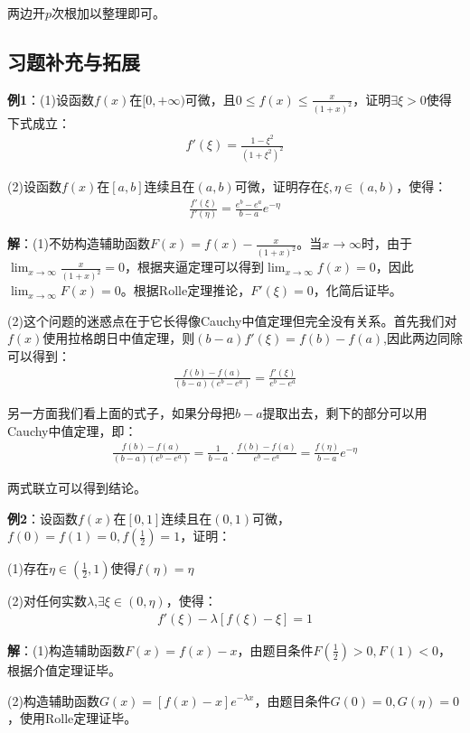 \documentclass{ctexart}
\let\oldtextbf\textbf %
\renewcommand{\textbf}[1]{\textcolor{btex}{\oldtextbf{#1}}} %
\begin{document}
两边开$p$次根加以整理即可。

\subsection{习题补充与拓展}
\textbf{例1}：(1)设函数$f(x)$在$[0,+\infty)$可微，且$0\leq f(x)\leq\frac{x}{(1+x)^2}$，证明$\exists \xi>0$使得下式成立：
\begin{align*}
    f'(\xi)=\frac{1-\xi^2}{(1+\xi^2)^2}
\end{align*}

(2)设函数$f(x)$在$[a,b]$连续且在$(a,b)$可微，证明存在$\xi,\eta\in(a,b)$，使得：
\begin{align*}
    \frac{f'(\xi)}{f'(\eta)}=\frac{e^b-e^a}{b-a}e^{-\eta}
\end{align*}

\textbf{解}：(1)不妨构造辅助函数$F(x)=f(x)-\frac{x}{(1+x)^2}$。当$x\to \infty$时，由于$\lim_{x\to\infty}\frac{x}{(1+x)^2}=0$，根据夹逼定理可以得到$\lim_{x\to\infty}f(x)=0$，因此$\lim_{x\to\infty}F(x)=0$。根据Rolle定理推论，$F'(\xi)=0$，化简后证毕。

(2)这个问题的迷惑点在于它长得像Cauchy中值定理但完全没有关系。首先我们对$f(x)$使用拉格朗日中值定理，则$(b-a)f'(\xi)=f(b)-f(a)$,因此两边同除可以得到：
\begin{align*}
    \frac{f(b)-f(a)}{(b-a)(e^b-e^a)}=\frac{f'(\xi)}{e^b-e^a}
\end{align*}

另一方面我们看上面的式子，如果分母把$b-a$提取出去，剩下的部分可以用Cauchy中值定理，即：
\begin{align*}
    \frac{f(b)-f(a)}{(b-a)(e^b-e^a)}=\frac{1}{b-a}\cdot\frac{f(b)-f(a)}{e^b-e^a}=\frac{f(\eta)}{b-a}e^{-\eta}
\end{align*}

两式联立可以得到结论。

\textbf{例2}：设函数$f(x)$在$[0,1]$连续且在$(0,1)$可微，$f(0)=f(1)=0,f(\frac{1}{2})=1$，证明：

(1)存在$\eta\in(\frac{1}{2},1)$使得$f(\eta)=\eta$

(2)对任何实数$\lambda$,$\exists \xi\in (0,\eta)$，使得：
\begin{align*}
    f'(\xi)-\lambda[f(\xi)-\xi]=1
\end{align*}

\textbf{解}：(1)构造辅助函数$F(x)=f(x)-x$，由题目条件$F(\frac{1}{2})>0,F(1)<0$，根据介值定理证毕。

(2)构造辅助函数$G(x)=[f(x)-x]e^{-\lambda x}$，由题目条件$G(0)=0,G(\eta)=0$，使用Rolle定理证毕。
\end{document}
